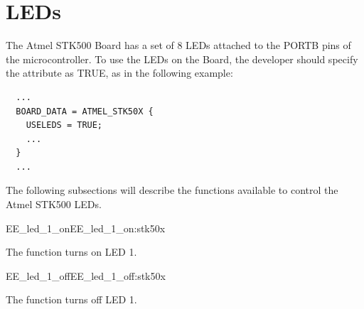 
\section{LEDs}

The Atmel STK500 Board has a set of 8 LEDs attached to the PORTB pins
of the microcontroller. To use the LEDs on the Board, the developer
should specify the  attribute as TRUE, as in the
following example:

\begin{lstlisting}
  ...
  BOARD_DATA = ATMEL_STK50X {
    USELEDS = TRUE;
    ...
  }
  ...
\end{lstlisting}

The following subsections will describe the functions available to
control the Atmel STK500 LEDs.


\begin{function_nopb2}{EE\_led\_1\_on}{EE_led_1_on:stk50x}
  
  \begin{fundescription}
    The function turns on LED 1.
  \end{fundescription}
  
  
  
\end{function_nopb2}

\begin{function_nopb2}{EE\_led\_1\_off}{EE_led_1_off:stk50x}
  
  \begin{fundescription}
    The function turns off LED 1.
  \end{fundescription}
  
  
  
\end{function_nopb2}

